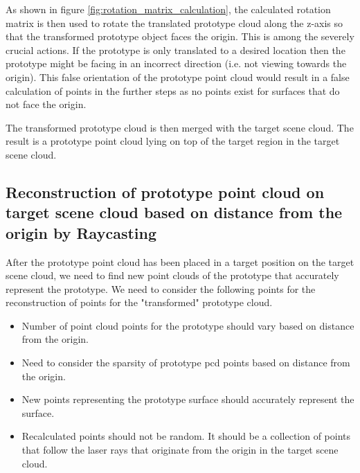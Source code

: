 As shown in figure \ref{fig:rotation_matrix_calculation}, the calculated rotation matrix is then used to rotate the translated prototype cloud along the z-axis so that the transformed prototype object faces the origin. This is among the severely crucial actions. If the prototype is only translated to a desired location then the prototype might be facing in an incorrect direction (i.e. not viewing towards the origin). This false orientation of the prototype point cloud would result in a false calculation of points in the further steps as no points exist for surfaces that do not face the origin.

The transformed prototype cloud is then merged with the target scene cloud. The result is a prototype point cloud lying on top of the target region in the target scene cloud.


\subsection{Reconstruction of prototype point cloud on target scene cloud based on distance from the origin by Raycasting}

After the prototype point cloud has been placed in a target position on the target scene cloud, we need to find new point clouds of the prototype that accurately represent the prototype. We need to consider the following points for the reconstruction of points for the "transformed" prototype cloud.
\begin{itemize}
    \item Number of point cloud points for the prototype should vary based on distance from the origin.
    \item Need to consider the sparsity of prototype \acrshort{pcd} points based on distance from the origin.
    \item New points representing the prototype surface should accurately represent the surface.
    \item Recalculated points should not be random. It should be a collection of points that follow the laser rays that originate from the origin in the target scene cloud.
\end{itemize}

